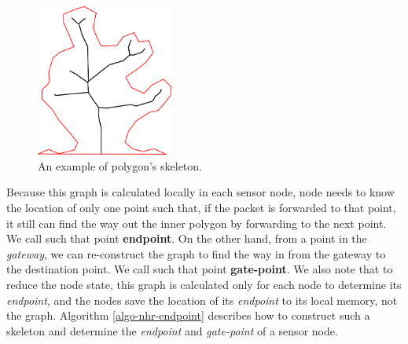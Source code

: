 \begin{figure}[!htb]
\centering
\includegraphics[width=0.4\textwidth]{Chapter4/Chapter4Figs/fig-skeleton.eps}
\caption{An example of polygon's skeleton.}
\label{fig-nhr-skeleton}
\end{figure}

Because this graph is calculated locally in each sensor node, node needs to know the location of only one point such that, if the packet is forwarded to that point, it still can find the way out the inner polygon by forwarding to the next point. We call such that point \textbf{endpoint}. On the other hand, from a point in the \emph{gateway}, we can re-construct the graph to find the way in from the gateway to the destination point. We call such that point \textbf{gate-point}. We also note that to reduce the node state, this graph is calculated only for each node to determine its \emph{endpoint}, and the nodes save the location of its \emph{endpoint} to its local memory, not the graph.
Algorithm \ref{algo-nhr-endpoint} describes how to construct such a skeleton and determine the \emph{endpoint} and \emph{gate-point} of a sensor node.


